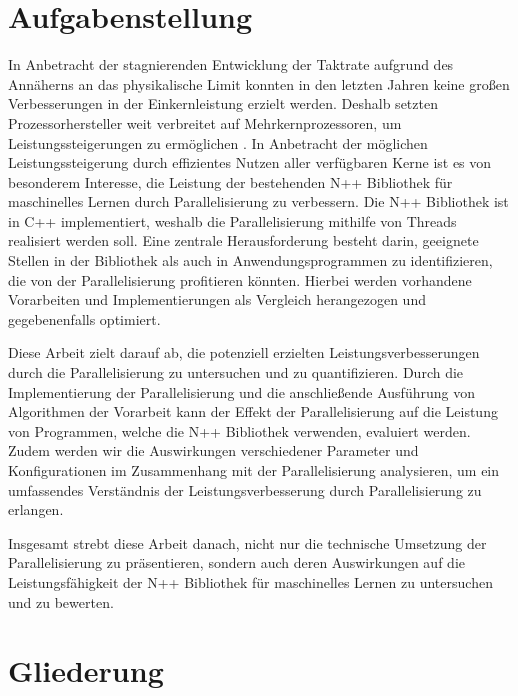 \section{Aufgabenstellung}
\label{sec:Einleitung_Aufgabenstellung}
In Anbetracht der stagnierenden Entwicklung der Taktrate aufgrund des Annäherns an das physikalische Limit konnten in den letzten Jahren keine großen Verbesserungen in der Einkernleistung erzielt werden. Deshalb setzten Prozessorhersteller weit verbreitet auf Mehrkernprozessoren, um Leistungssteigerungen zu ermöglichen \citep{Chip_makers_turn_to_multicore}. In Anbetracht der möglichen Leistungssteigerung durch effizientes Nutzen aller verfügbaren Kerne ist es von besonderem Interesse, die Leistung der bestehenden N++ Bibliothek für maschinelles Lernen durch Parallelisierung zu verbessern. Die N++ Bibliothek ist in C++ implementiert, weshalb die Parallelisierung mithilfe von Threads realisiert werden soll. Eine zentrale Herausforderung besteht darin, geeignete Stellen in der Bibliothek als auch in Anwendungsprogrammen zu identifizieren, die von der Parallelisierung profitieren könnten. Hierbei werden vorhandene Vorarbeiten und Implementierungen als Vergleich herangezogen und gegebenenfalls optimiert.

Diese Arbeit zielt darauf ab, die potenziell erzielten Leistungsverbesserungen durch die Parallelisierung zu untersuchen und zu quantifizieren. Durch die Implementierung der Parallelisierung und die anschließende Ausführung von Algorithmen der Vorarbeit kann der Effekt der Parallelisierung auf die Leistung von Programmen, welche die N++ Bibliothek verwenden, evaluiert werden. Zudem werden wir die Auswirkungen verschiedener Parameter und Konfigurationen im Zusammenhang mit der Parallelisierung analysieren, um ein umfassendes Verständnis der Leistungsverbesserung durch Parallelisierung zu erlangen.

Insgesamt strebt diese Arbeit danach, nicht nur die technische Umsetzung der Parallelisierung zu präsentieren, sondern auch deren Auswirkungen auf die Leistungsfähigkeit der N++ Bibliothek für maschinelles Lernen zu untersuchen und zu bewerten.

\section{Gliederung}
\label{sec:Einleitung_Gliederung}






